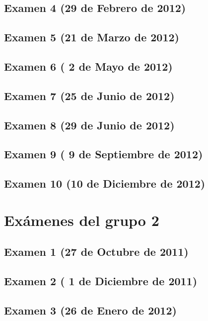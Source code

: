 \documentclass[a4paper,12pt,twoside]{book}
\begin{document}
\section{Examen 4 (29 de Febrero de 2012)}
\section{Examen 5 (21 de Marzo de 2012)}
\section{Examen 6 ( 2 de Mayo de 2012)}
\section{Examen 7 (25 de Junio de 2012)} 
\section{Examen 8 (29 de Junio de 2012)} 
\label{examen_11_12_1_8}
\section{Examen 9 ( 9 de Septiembre de 2012)} 
\label{examen_11_12_1_9}
\section{Examen 10 (10 de Diciembre de 2012)} 
\label{examen_11_12_1_10}

\chapter{Exámenes del grupo 2}
\section{Examen 1 (27 de Octubre de 2011)}
\section{Examen 2 ( 1 de Diciembre de 2011)}
\section{Examen 3 (26 de Enero de 2012)}
\end{document}
